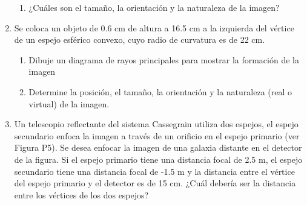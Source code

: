 \documentclass[letterpaper,11pt]{article}
\begin{document}
\begin{enumerate}
\begin{enumerate}
    \item ¿Cuáles son el tamaño, la orientación y la naturaleza de la imagen?
\end{enumerate}

\item Se coloca un objeto de 0.6 cm de altura a 16.5 cm a la izquierda del vértice de un espejo esférico convexo, cuyo radio de curvatura es de 22 cm.

\begin{enumerate}
    \item Dibuje un diagrama de rayos principales para mostrar la formación de la imagen
    
    \item Determine la posición, el tamaño, la orientación y la naturaleza (real o virtual) de la imagen.
\end{enumerate}

\item Un telescopio reflectante del sistema Cassegrain utiliza dos espejos, el espejo secundario enfoca la imagen a través de un orificio en el espejo primario (ver Figura P5). Se desea enfocar la imagen de una galaxia distante en el detector de la figura. Si el espejo primario tiene una distancia focal de 2.5 m, el espejo secundario tiene una distancia focal de -1.5 m y la distancia entre el vértice del espejo primario y el detector es de 15 cm. ¿Cuál debería ser la distancia entre los vértices de los dos espejos?
\end{enumerate}
\end{document}
